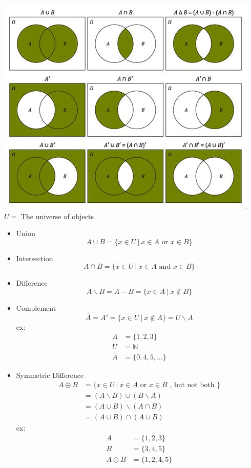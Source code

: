 \documentclass{article}
\begin{document}
\includegraphics[width=\textwidth]{l1_venn_ab}
$U =$ The universe of objects
\begin{itemize}
    \item Union
          \[
              A \cup B =\{x\in U \ | \ x \in A \text{ or } x \in B\}
          \]
    \item Intersection
          \[
              A \cap B = \{x \in U \ | \ x \in A \text{ and } x \in B\}
          \]
    \item Difference
          \[
              A \backslash B = A-B = \{x \in A \ | \ x \notin B\}
          \]
    \item Complement \[
              \overline{A} = A' = \{x \in U \ | \ x \notin A\} = U \backslash A
          \]ex:
          \begin{align*}
              A            & = \{1,2,3\}      \\
              U            & = \mathbb{N}     \\
              \overline{A} & =\{0,4,5,\dots\}
          \end{align*}
    \item Symmetric Difference \begin{align*}
              A \oplus B & = \{x \in U \ | \ x \in A \text{ or } x \in B \text{ , but not both } \} \\
                         & = (A \backslash B) \cup (B \backslash A)                                 \\
                         & = (A\cup B) \backslash (A \cap B)                                        \\
                         & = (A\cup B) \cap (A\cup B)
          \end{align*}
          ex:
          \begin{align*}
              A          & = \{1,2,3\}   \\
              B          & = \{3,4,5\}   \\
              A \oplus B & = \{1,2,4,5\}
          \end{align*}


\end{itemize}
\end{document}
